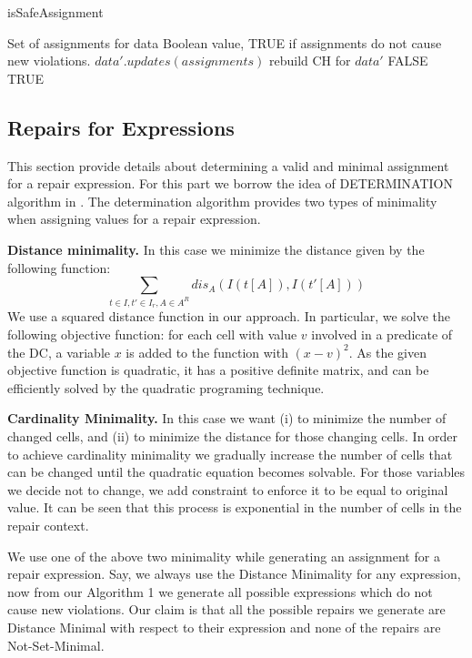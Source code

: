 \begin{algorithm}
\caption{isSafeAssignment}
\begin{algorithmic}[1] 
\REQUIRE Set of assignments for data
\ENSURE Boolean value, TRUE if assignments do not cause new violations.
\STATE $data'.updates(assignments)$
\STATE rebuild CH for $data'$
\RETURN FALSE
\ELSE
\RETURN TRUE
\ENDIF
\end{algorithmic}
\end{algorithm}

\subsection{Repairs for Expressions}
This section provide details about determining a valid and minimal assignment for a repair expression.
For this part we borrow the idea of DETERMINATION algorithm in \cite{XuChu}.
The determination algorithm provides two types of minimality when assigning values for a repair expression.

\textbf{Distance minimality.} In this case we minimize the distance given by the following function:
\begin{displaymath}
\sum\limits_{t \in I, t' \in I_r, A \in A^R} dis_A(I(t[A]),I(t'[A]))
\end{displaymath}
We use a squared distance function in our approach.
In particular, we solve the following objective function:
for each cell with value $v$ involved in a predicate of the DC, a variable $x$ is added to the function with $(x - v)^2$.
As the given objective function is quadratic, it has a positive definite matrix, and can be efficiently solved by the quadratic programing technique.

\textbf{Cardinality Minimality.} In this case we want (i) to minimize the number of changed cells, and (ii) to minimize the distance for those changing cells.
In order to achieve cardinality minimality we gradually increase the number of cells that can be changed until the quadratic equation becomes solvable.
For those variables we decide not to change, we add constraint to enforce it to be equal to original value.
It can be seen that this process is exponential in the number of cells in the repair context.

We use one of the above two minimality while generating an assignment for a repair expression.
Say, we always use the Distance Minimality for any expression, now from our Algorithm 1 we generate all possible expressions which do not cause new violations.
Our claim is that all the possible repairs we generate are Distance Minimal with respect to their expression and none of the repairs are Not-Set-Minimal.
